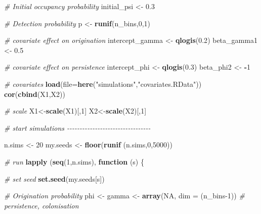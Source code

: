 \documentclass[
]{article}
\newenvironment{Shaded}{\begin{snugshade}}{\end{snugshade}}
\newcommand{\AttributeTok}[1]{\textcolor[rgb]{0.13,0.29,0.53}{#1}}
\newcommand{\CommentTok}[1]{\textcolor[rgb]{0.56,0.35,0.01}{\textit{#1}}}
\newcommand{\ConstantTok}[1]{\textcolor[rgb]{0.56,0.35,0.01}{#1}}
\newcommand{\ControlFlowTok}[1]{\textcolor[rgb]{0.13,0.29,0.53}{\textbf{#1}}}
\newcommand{\DecValTok}[1]{\textcolor[rgb]{0.00,0.00,0.81}{#1}}
\newcommand{\FloatTok}[1]{\textcolor[rgb]{0.00,0.00,0.81}{#1}}
\newcommand{\FunctionTok}[1]{\textcolor[rgb]{0.13,0.29,0.53}{\textbf{#1}}}
\newcommand{\NormalTok}[1]{#1}
\newcommand{\OtherTok}[1]{\textcolor[rgb]{0.56,0.35,0.01}{#1}}
\newcommand{\SpecialCharTok}[1]{\textcolor[rgb]{0.81,0.36,0.00}{\textbf{#1}}}
\newcommand{\StringTok}[1]{\textcolor[rgb]{0.31,0.60,0.02}{#1}}
\begin{document}
{\begin{Shaded}
\begin{Highlighting}[]
\CommentTok{\# Initial occupancy probability}
\NormalTok{initial\_psi }\OtherTok{\textless{}{-}} \FloatTok{0.3}

\CommentTok{\# Detection probability}
\NormalTok{p }\OtherTok{\textless{}{-}} \FunctionTok{runif}\NormalTok{(n\_bins,}\DecValTok{0}\NormalTok{,}\DecValTok{1}\NormalTok{)  }

\CommentTok{\# covariate effect on origination}
\NormalTok{intercept\_gamma }\OtherTok{\textless{}{-}} \FunctionTok{qlogis}\NormalTok{(}\FloatTok{0.2}\NormalTok{) }
\NormalTok{beta\_gamma1 }\OtherTok{\textless{}{-}} \FloatTok{0.5}

\CommentTok{\# covariate effect on persistence}
\NormalTok{intercept\_phi }\OtherTok{\textless{}{-}} \FunctionTok{qlogis}\NormalTok{(}\FloatTok{0.3}\NormalTok{)  }
\NormalTok{beta\_phi2 }\OtherTok{\textless{}{-}} \SpecialCharTok{{-}}\DecValTok{1}

\CommentTok{\# covariates}
\FunctionTok{load}\NormalTok{(}\AttributeTok{file=}\FunctionTok{here}\NormalTok{(}\StringTok{"simulations"}\NormalTok{,}\StringTok{"covariates.RData"}\NormalTok{))}
\FunctionTok{cor}\NormalTok{(}\FunctionTok{cbind}\NormalTok{(X1,X2))}

\CommentTok{\# scale}
\NormalTok{X1}\OtherTok{\textless{}{-}}\FunctionTok{scale}\NormalTok{(X1)[,}\DecValTok{1}\NormalTok{]}
\NormalTok{X2}\OtherTok{\textless{}{-}}\FunctionTok{scale}\NormalTok{(X2)[,}\DecValTok{1}\NormalTok{]}

\CommentTok{\# start simulations {-}{-}{-}{-}{-}{-}{-}{-}{-}{-}{-}{-}{-}{-}{-}{-}{-}{-}{-}{-}{-}{-}{-}{-}{-}{-}{-}{-}{-}{-}{-}{-}{-}}

\NormalTok{n.sims }\OtherTok{\textless{}{-}} \DecValTok{20}
\NormalTok{my.seeds }\OtherTok{\textless{}{-}} \FunctionTok{floor}\NormalTok{(}\FunctionTok{runif}\NormalTok{ (n.sims,}\DecValTok{0}\NormalTok{,}\DecValTok{5000}\NormalTok{))}

\CommentTok{\# run}
\FunctionTok{lapply}\NormalTok{ (}\FunctionTok{seq}\NormalTok{(}\DecValTok{1}\NormalTok{,n.sims), }\ControlFlowTok{function}\NormalTok{ (s) \{}
  
        \CommentTok{\# set seed}
        \FunctionTok{set.seed}\NormalTok{(my.seeds[s])}
        
        \CommentTok{\# Origination probability}
\NormalTok{        phi }\OtherTok{\textless{}{-}}\NormalTok{ gamma }\OtherTok{\textless{}{-}} \FunctionTok{array}\NormalTok{(}\ConstantTok{NA}\NormalTok{, }\AttributeTok{dim =}\NormalTok{ (n\_bins}\DecValTok{{-}1}\NormalTok{)) }\CommentTok{\# persistence, colonisation}
         

\end{Highlighting}
\end{Shaded}}
\end{document}
